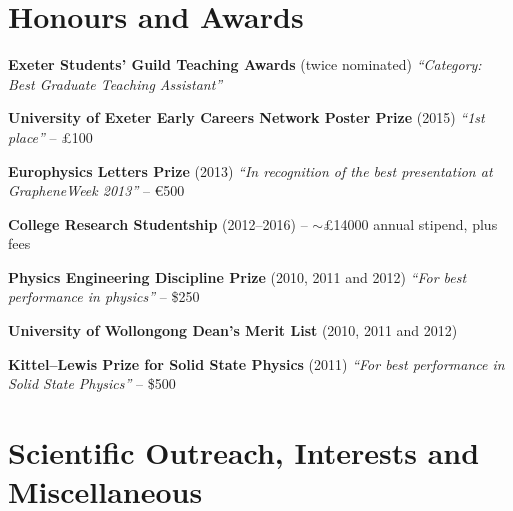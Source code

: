 \documentclass[11pt,a4paper,sans]{moderncv}        %
\begin{document}
\section{Honours and Awards}
\vspace{5pt}
\begin{itemize}\small{
\item{\textbf{Exeter Students’ Guild Teaching Awards} \small{(twice nominated) \textit{``Category: Best Graduate Teaching Assistant''}}}
\item{\textbf{University of Exeter Early Careers Network Poster Prize} \small{(2015) \textit{``1st place''}} -- £100}
\item{\textbf{Europhysics Letters Prize} \small{(2013) \textit{``In recognition of the best presentation at GrapheneWeek 2013''}} -- \euro 500}
\item{\textbf{College Research Studentship}\small{ (2012--2016)} -- $\sim$£14000 annual stipend, plus fees}
\item{\textbf{Physics Engineering Discipline Prize} \small{(2010, 2011 and 2012) \textit{``For best performance in physics''}} -- \$250}
\item{\textbf{University of Wollongong Dean's Merit List}\small{ (2010, 2011 and 2012)}}
\item{\textbf{Kittel--Lewis Prize for Solid State Physics}\small{ (2011) \textit{``For best performance in Solid State Physics''}} -- \$500}}
\end{itemize}

\section{Scientific Outreach, Interests and Miscellaneous}

\vspace{5pt}
\end{document}
